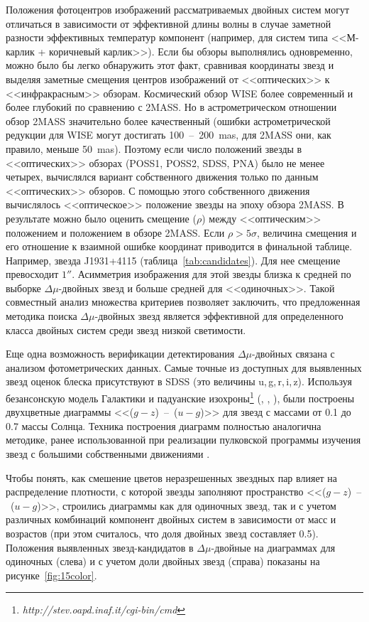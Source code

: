 Положения фотоцентров изображений рассматриваемых двойных систем могут отличаться в зависимости от эффективной длины волны в случае заметной разности эффективных температур компонент (например, для систем типа <<М-карлик + коричневый карлик>>). Если бы обзоры выполнялись одновременно, можно было бы легко обнаружить этот факт, сравнивая координаты звезд и выделяя заметные смещения центров изображений от <<оптических>> к <<инфракрасным>> обзорам. Космический обзор WISE более современный и более глубокий по сравнению с 2MASS. Но в астрометрическом отношении обзор 2MASS значительно более качественный (ошибки астрометрической редукции для WISE могут достигать 100~--~200~mas, для 2MASS они, как правило, меньше 50~mas). Поэтому если число положений звезды в <<оптических>> обзорах (POSS1, POSS2, SDSS, PNA) было не менее четырех, вычислялся вариант собственного движения только по данным <<оптических>> обзоров. С помощью этого собственного движения вычислялось <<оптическое>> положение звезды на эпоху обзора 2MASS. В результате можно было оценить смещение ($\rho$) между <<оптическим>> положением и положением в обзоре 2MASS. Если $\rho>5\sigma$, величина смещения и его отношение к взаимной ошибке координат приводится в финальной таблице. Например, звезда J1931+4115 (таблица~\ref{tab:candidates}). Для нее смещение превосходит $1''$. Асимметрия изображения для этой звезды близка к средней по выборке $\Delta\mu$-двойных звезд и больше средней для <<одиночных>>. Такой совместный анализ множества критериев позволяет заключить, что предложенная методика поиска $\Delta\mu$-двойных звезд является эффективной для определенного класса двойных систем среди звезд низкой светимости.

Еще одна возможность верификации детектирования $\Delta\mu$-двойных связана с анализом фотометрических данных. Самые точные из доступных для выявленных звезд оценок блеска присутствуют в SDSS (это величины u,\,g,\,r,\,i,\,z). Используя безансонскую модель Галактики \cite{2003A&A...409..523R} и падуанские изохроны\footnote{\textit{http://stev.oapd.inaf.it/cgi-bin/cmd}} (\cite{2012MNRAS.427..127B}, \cite{2014MNRAS.444.2525C}, \cite{2014MNRAS.445.4287T}), были построены двухцветные диаграммы <<($g-z$)~--~($u-g$)>> для звезд с массами от 0.1 до 0.7 массы Солнца. Техника построения диаграмм полностью аналогична методике, ранее использованной при реализации пулковской программы изучения звезд с большими собственными движениями \cite{2013MNRAS.435.1083K}.

Чтобы понять, как смешение цветов неразрешенных звездных пар влияет на распределение плотности, с которой звезды заполняют пространство <<($g-z$)~--~($u-g$)>>, строились диаграммы как для одиночных звезд, так и с учетом различных комбинаций компонент двойных систем в зависимости от масс и возрастов (при этом считалось, что доля двойных звезд составляет 0.5).  Положения выявленных звезд-кандидатов в $\Delta\mu$-двойные на диаграммах для одиночных (слева) и с учетом доли двойных звезд (справа) показаны на рисунке~\ref{fig:15color}.

